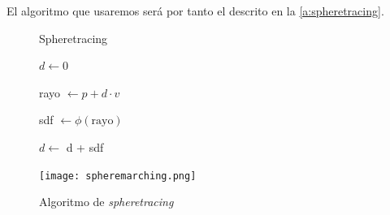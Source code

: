 El algoritmo que usaremos será por tanto el descrito en la \autoref{a:spheretracing}. 
\begin{figure}[ht!]
    \centering
    \begin{minipage}{0.50\textwidth}
       \begin{algorithm}[H]
            \caption{Spheretracing}
                $d \gets 0$ 
                
                 {
                    rayo $\gets p + d \cdot v$
                    
                    sdf $\gets \phi(\text{rayo})$
                    
            
                    $d \gets$ d + sdf
            
                }
        \end{algorithm}
    \end{minipage}%
    \hfill
    \begin{minipage}{0.48\textwidth}
        \texttt{[image: spheremarching.png]}
    \end{minipage}
    \caption{Algoritmo de \textit{spheretracing}}
    \label{a:spheretracing}
\end{figure}

